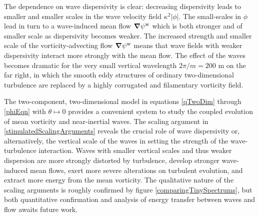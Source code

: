 \documentclass[12pt, oneside]{book}
\begin{document}
\begin{subappendices}
The dependence on wave dispersivity is clear: decreasing dispersivity leads to smaller and smaller scales in the wave velocity field $\kappa^2 | \phi |$.  The small-scales in $\phi$ lead in turn to a wave-induced mean flow $\boldsymbol \nabla \psi^{\mathrm{w}}$ which is both stronger and of smaller scale as dispersivity becomes weaker.  The increased strength and smaller scale of the vorticity-advecting flow $\boldsymbol \nabla \psi^{\mathrm{w}}$ means that wave fields with weaker dispersivity interact more strongly with the mean flow.  The effect of the waves becomes dramatic for the very small vertical wavelength $2 \pi / m = 200$ m on the far right, in which the smooth eddy structures of ordinary two-dimensional turbulence are replaced by a highly corrugated and filamentary vorticity field.  

The two-component, two-dimensional model in equations \eqref{qTwoDim} through \eqref{phiEqn} with $\theta \mapsto 0$ provides a convenient system to study the coupled evolution of mean vorticity and near-inertial waves.  The scaling argument in \ch \ref{stimulatedScalingArguments} reveals the crucial role of wave dispersivity or, alternatively, the vertical scale of the waves in setting the strength of the wave-turbulence interaction.  Waves with smaller vertical scales and thus weaker dispersion are more strongly distorted by turbulence, develop stronger wave-induced mean flows, exert more severe alterations on turbulent evolution, and extract more energy from the mean vorticity.  The qualitative nature of the scaling arguments is roughly confirmed by figure \ref{comparingTinySpectrums}, but both quantitative confirmation  and analysis of energy transfer between waves and flow awaits future work.  



\end{subappendices}
\end{document}
